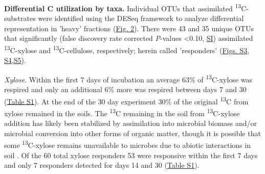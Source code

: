 \textbf{Differential C utilization by taxa.} Individual OTUs that assimilated \textsuperscript{13}C-substrates were identified using the DESeq framework \cite{Anders_Huber_2010} to analyze differential representation in 'heavy' fractions (\href{https://www.authorea.com/users/3537/articles/3612/master/file/figures/l2fc_fig1/l2fc_fig.pdf}{Fig. 2}). There were 43 and 35 unique OTUs that significantly (false discovery rate corrected \textit{P}-values \textless 0.10, \href{https://authorea.com/users/3537/articles/8459/_show_article}{SI}) assimilated \textsuperscript{13}C-xylose and \textsuperscript{13}C-cellulose, respectively; herein called 'responders' (\href{https://www.authorea.com/users/3537/articles/8459/master/file/figures/OTU_screening_schematic/OTU_screening_schematic.pdf}{Figs. S3}, \href{https://www.authorea.com/users/3537/articles/8459/master/file/figures/l2fc_fig_pVal/l2fc_fig_pVal.png}{S4},\href{https://authorea.com/users/3537/articles/8459/master/file/figures/manhattan/manhattan.png}{S5}).

\textit{Xylose}. Within the first 7 days of incubation an average 63\% of \textsuperscript{13}C-xylose was respired and only an additional 6\% more was respired between days 7 and 30 (\href{https://authorea.com/users/3537/articles/8459/master/file/figures/Percent_respired_13C/Percent_respired_13C.png}{Table S1}). At the end of the 30 day experiment 30\% of the original \textsuperscript{13}C from xylose remained in the soils. The \textsuperscript{13}C remaining in the soil from \textsuperscript{13}C-xylose addition has likely been stabilized by assimilation into microbial biomass and/or microbial conversion into other forms of organic matter, though it is possible that some \textsuperscript{13}C-xylose remains unavailable to microbes due to abiotic interactions in soil \cite{Kalbitz_2000}. Of the 60 total xylose responders 53 were responsive within the first 7 days and only 7 responders detected for days 14 and 30 (\href{https://authorea.com/users/3537/articles/8459/master/file/figures/resp_table/resp_table.png}{Table S1}). 


